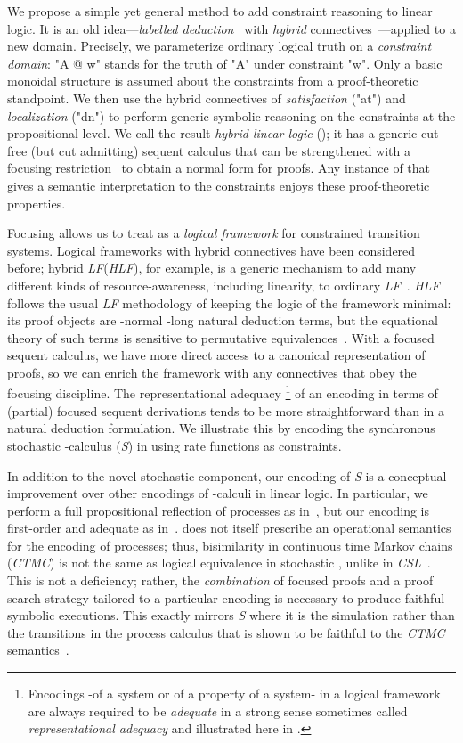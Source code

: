 \documentclass{article}
\newcommand\proofsystem[1]{{\smaller\rmfamily\slshape #1}\xspace}
\newcommand\LF{\proofsystem{LF}}
\newcommand\HLF{\proofsystem{HLF}}
\newcommand\Spi{\proofsystem{S}}
\newcommand\CTMC{\proofsystem{CTMC}}
\begin{document}
We propose a simple yet general method to add constraint reasoning to linear logic.
It is an old idea---\emph{labelled deduction}~\cite{simpson94phd} with 
\emph{hybrid} connectives~\cite{brauener06jal}---applied to a new domain. 
Precisely, we parameterize ordinary logical truth on a \emph{constraint domain}: 
"A @ w" stands for the truth of "A" under constraint "w". 
Only a basic monoidal structure is assumed about the constraints from a
proof-theoretic standpoint.
We then use the hybrid connectives of \emph{satisfaction} ("at") and
\emph{localization} ("dn") to perform generic symbolic reasoning on the
constraints at the propositional level.
We call the result \emph{hybrid linear logic} (\hyll); it has a generic cut-free
(but cut admitting) sequent calculus that can be strengthened with a focusing
restriction~\cite{andreoli92jlc} to obtain a normal form for proofs.
Any instance of \hyll that gives a semantic interpretation to the constraints
enjoys these proof-theoretic properties.

Focusing allows us to treat \hyll as a \emph{logical framework} 
for constrained transition systems.
Logical frameworks with hybrid connectives have been considered before; hybrid
\LF (\HLF), for example, is a generic mechanism to add many different kinds of
resource-awareness, including linearity, to ordinary \LF~\cite{reed06hylo}.
\HLF follows the usual \LF methodology of keeping the logic of the framework
minimal: its proof objects are -normal -long natural deduction
terms, but the equational theory of such terms is sensitive to permutative
equivalences~\cite{watkins03tr}.
With a focused sequent calculus, we have more direct access to a canonical
representation of proofs, so we can enrich the framework with any connectives
that obey the focusing discipline.
The representational adequacy \footnote
{Encodings -of a system or of a property of a system- in a logical framework
are always required to be {\it adequate} in a strong sense 
sometimes called {\it representational adequacy} and illustrated here in .
}
of an encoding in terms of (partial) focused
sequent derivations tends to be more straightforward than in a natural deduction
formulation.
We illustrate this by encoding the synchronous stochastic -calculus (\Spi)
in \hyll using rate functions as constraints.

In addition to the novel stochastic component, our encoding of \Spi is a
conceptual improvement over other encodings of -calculi in linear logic.
In particular, we perform a full propositional reflection of processes as
in~\cite{miller92welp}, but our encoding is first-order and adequate as
in~\cite{cervesato03tr}.
\hyll does not itself prescribe an operational semantics for the encoding of
processes; thus, bisimilarity in continuous time Markov chains (\CTMC) is not
the same as logical equivalence in stochastic \hyll, unlike in
\proofsystem{CSL}~\cite{desharmais03jlap}.
This is not a deficiency; rather, the \emph{combination} of focused \hyll proofs
and a proof search strategy tailored to a particular encoding is necessary to
produce faithful symbolic executions.
This exactly mirrors \Spi where it is the simulation rather than the transitions
in the process calculus that is shown to be faithful to the \CTMC
semantics~\cite{phillips04cmmb}.
\end{document}
